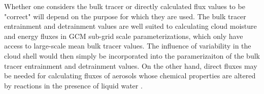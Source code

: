 \documentclass[draft,grl]{agutex}
\begin{document}
\begin{article}
Whether one considers the bulk tracer or directly calculated flux values to be 
"correct" will depend on the purpose for which they are used.  The bulk tracer 
entrainment and detrainment values are well suited to calculating cloud moisture 
and energy fluxes in GCM sub-grid scale parameterizations, which only have 
access to large-scale mean bulk tracer values.  The influence of variability 
in the cloud shell would then simply be incorporated into the paramerizaiton 
of the bulk tracer entrainment and detrainment values.  On the other hand, 
direct fluxes may be needed for calculating fluxes of aerosols whose 
chemical properties are altered by reactions in the presence of liquid water 
\citep{Hoppel1994}.  


%
%
%
%
%
%


\end{article}
\end{document}
